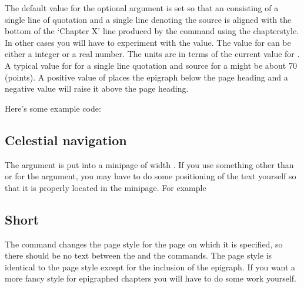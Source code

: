     The default value for the optional  argument is set so
 that an \cmd{\epigraph} consisting of a single line of 
quotation and a single
line denoting the source is aligned with the bottom of the `Chapter X'
line produced by the \cmd{\chapter} command using the  
chapterstyle. In other cases you will
have to experiment with the  value. The value for
 can be either a integer or a real number. The units
are in terms of the current value for \lnc{\unitlength}. A typical value
for  for a single line quotation and 
source for a \cmd{\chapter*} might be about 70 (points). A positive value
of  places the epigraph below the page heading and a negative
value will raise it above the page heading.

    Here's some example code:
 \begin{lcode}
 \chapter*{Celestial navigation}
 \end{lcode}
 The  argument is put into a minipage of width \lnc{\epigraphwidth}.
 If you use something other than \cmd{\epigraph} or  for the
  argument, you may have to do some positioning of the text
 yourself so that it is properly located in the minipage. For example
 \begin{lcode}
 \chapter{Short}
 \renewcommand{\epigraphflush}{center}
 \end{lcode}

 The \cmd{\epigraphhead} command changes the page style for the page on
 which it is specified, so there should be no text between the
\cmd{\chapter} and the \cmd{\epigraphhead} commands. The page style
is identical to the  page style except for the inclusion of
the epigraph.
    If you want a more fancy style for epigraphed chapters you will have
to do some work yourself.

